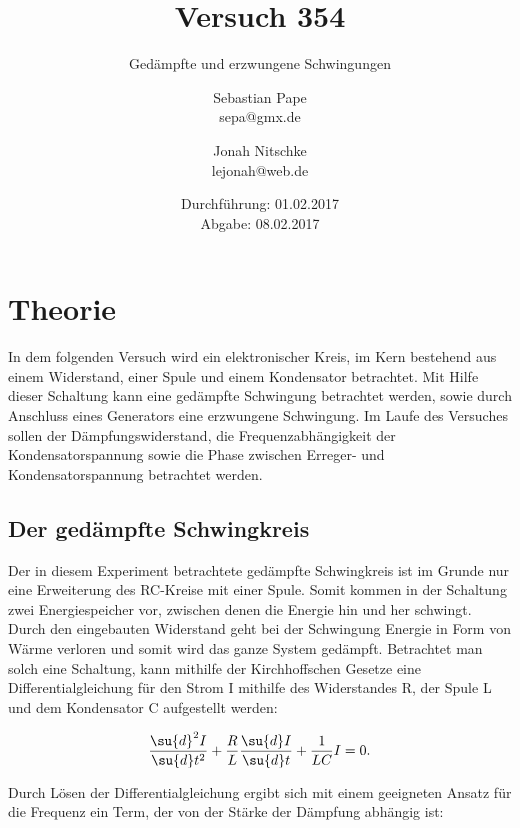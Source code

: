 

\title{Versuch 354}
\subtitle{Gedämpfte und erzwungene Schwingungen}
\author{Sebastian Pape\\
        sepa@gmx.de \and
        Jonah Nitschke\\
        lejonah@web.de}
\date{Durchführung: 01.02.2017\\
      Abgabe: 08.02.2017}



\maketitle
\newpage

\section{Theorie}

In dem folgenden Versuch wird ein elektronischer Kreis, im Kern bestehend aus einem
Widerstand, einer Spule und einem Kondensator betrachtet. Mit Hilfe dieser Schaltung kann eine
gedämpfte Schwingung betrachtet werden, sowie durch Anschluss eines Generators
eine erzwungene Schwingung. Im Laufe des Versuches sollen der Dämpfungswiderstand,
die Frequenzabhängigkeit der Kondensatorspannung sowie die Phase zwischen
Erreger- und Kondensatorspannung betrachtet werden.

\subsection{Der gedämpfte Schwingkreis}

Der in diesem Experiment betrachtete gedämpfte Schwingkreis ist im Grunde nur
eine Erweiterung des RC-Kreise mit einer Spule. Somit kommen in der Schaltung
zwei Energiespeicher vor, zwischen denen die Energie hin und her schwingt. Durch
den eingebauten Widerstand geht bei der Schwingung Energie in Form von Wärme verloren
und somit wird das ganze System gedämpft. Betrachtet man solch eine Schaltung, kann
mithilfe der Kirchhoffschen Gesetze eine Differentialgleichung für den Strom I
mithilfe des Widerstandes R, der Spule L und dem Kondensator C aufgestellt werden:

\begin{equation}
  \frac{\su{d}^2I}{\su{d}t^2} + \frac{R}{L}\frac{\su{d}I}{\su{d}t} + \frac{1}{LC} I = 0 .
\end{equation}

Durch Lösen der Differentialgleichung ergibt sich mit einem geeigneten Ansatz für
die Frequenz ein Term, der von der Stärke der Dämpfung abhängig ist:

